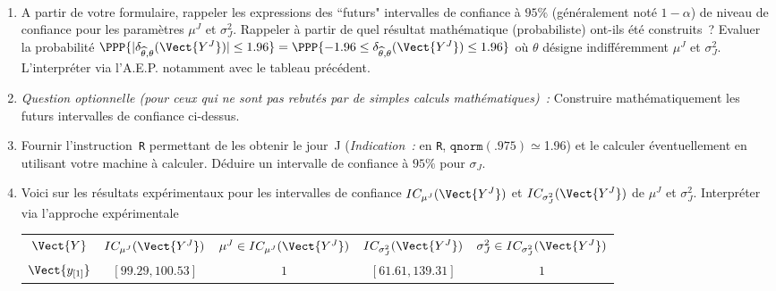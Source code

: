\documentclass[10pt]{report}
\begin{document}
\begin{exercice}${ }$
\begin{enumerate}
\item A partir de votre formulaire, rappeler les expressions des ``futurs"  intervalles de confiance à $95\%$ (généralement noté $1-\alpha$) de niveau de confiance pour les paramètres $\mu^J$ et $\sigma^2_J$. Rappeler à partir de quel résultat mathématique (probabiliste) ont-ils été construits~?
Evaluer la probabilité $\PPP{|\delta_{\widehat\theta,\theta}(\Vect{Y^J})| \leq 1.96}=\PPP{-1.96 \leq \delta_{\widehat\theta,\theta}(\Vect{Y^J}) \leq 1.96}$ où $\theta$ désigne indifféremment $\mu^J$ et $\sigma^2_J$. L'interpréter via l'A.E.P. notamment avec le tableau précédent.
\item \textit{Question optionnelle (pour ceux qui ne sont pas rebutés par de simples calculs mathématiques)~:} Construire mathématiquement les futurs intervalles de confiance ci-dessus. 
\item Fournir l'instruction~\texttt{R} permettant de les obtenir le jour~J (\textit{Indication~:} en \texttt{R}, $\mathtt{qnorm(.975)}\simeq$1.96) et le calculer éventuellement en utilisant votre machine à calculer. Déduire un intervalle de confiance à $95\%$ pour $\sigma_J$.
\item Voici sur les résultats expérimentaux pour les intervalles de confiance $IC_{\mu^J}(\Vect{Y^J})$ et $IC_{\sigma^2_J}(\Vect{Y^J})$ de $\mu^J$ et $\sigma^2_J$. Interpréter via l'approche expérimentale
\begin{center}\begin{tabular}{c|cc|cc}
        $\Vect{Y}$
         & 
    
        $IC_{\mu^J}(\Vect{Y^J})$
         & 
    
        $\mu^J\in IC_{\mu^J}(\Vect{Y^J})$
         & 
    
        $IC_{\sigma^2_J}(\Vect{Y^J})$
         & 
    
        $\sigma^2_J\in IC_{\sigma^2_J}(\Vect{Y^J})$
        
    \\ \cline{1-5}

    
        $\Vect{y_{[1]}}$
         & 
    
        $[99.29,100.53]$
         & 
    
        $1$
         & 
    
        $[61.61,139.31]$
         & 
    
        $1$
        

\end{tabular}
\end{center}
\end{enumerate}
\end{exercice}
\end{document}
